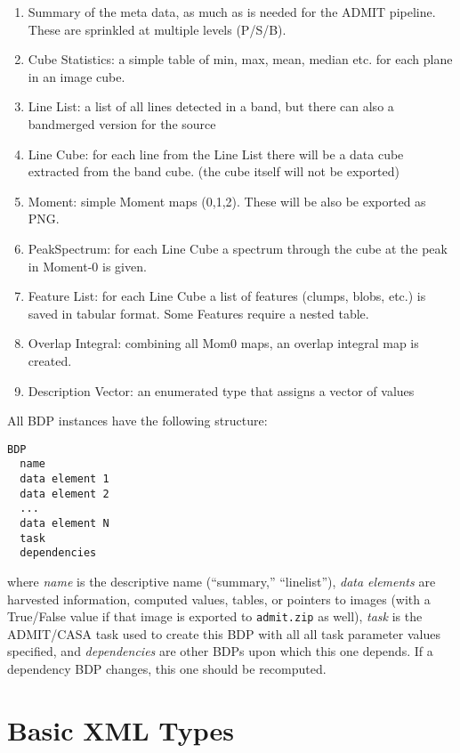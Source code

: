 \documentclass{article}
\begin{document}
\begin{enumerate}
\item
Summary of the meta data, as much as is needed for the ADMIT pipeline. These
are sprinkled at multiple levels (P/S/B).
\item
Cube Statistics: a simple table of min, max, mean, median etc. for each plane in
an image cube.
\item
Line List: a list of all lines detected in a band, but there can also a 
bandmerged version for the source
\item
Line Cube: for each line from the Line List there will be a data cube extracted from the
band cube.  (the cube itself will not be exported)
\item
Moment: simple Moment maps (0,1,2). These will be also be exported as PNG.
\item
PeakSpectrum: for each Line Cube a spectrum through the cube at the peak in Moment-0 is given.
\item
Feature List: for each Line Cube a list of features (clumps, blobs, etc.) is saved in tabular format.
Some Features require a nested table. 
\item 
Overlap Integral: combining all Mom0 maps, an overlap integral map is created.
\item
Description Vector: an enumerated type that assigns a vector of values 
\end{enumerate}

\noindent All BDP instances have the following structure:

\begin{verbatim}
BDP
  name 
  data element 1
  data element 2
  ...
  data element N
  task
  dependencies
\end{verbatim}

\noindent where {\it name} is the descriptive name (``summary,''
``linelist''), {\it data elements} are harvested information, computed 
values, tables, or pointers to images (with a True/False value if that
image is exported to {\tt admit.zip} as well),
{\it task} is the ADMIT/CASA 
task used to create this BDP with all all task parameter values specified,
and {\it dependencies} are other BDPs upon which this one depends. 
If a dependency BDP changes, this one should be recomputed.


\section{Basic XML Types}
\end{document}
